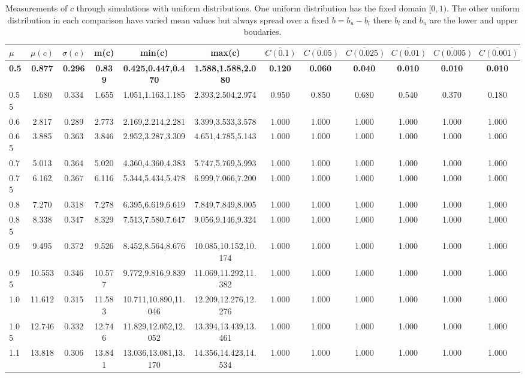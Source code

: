 \begin{table*}[h!]
\begin{center}
\begin{tabular}{| l | c | c | c | c | c | c | c | c | c | c | c |}\hline
$\mu$ & $\mu(c)$ & $\sigma(c)$ & m(c) & min(c) & max(c) & $\overline{C(0.1)}$ & $\overline{C(0.05)}$ & $\overline{C(0.025)}$ & $\overline{C(0.01)}$ & $\overline{C(0.005)}$ & $\overline{C(0.001)}$ \\\hline\hline
{\bf 0.5} & {\bf 0.877} & {\bf 0.296} & {\bf 0.839} & {\bf 0.425,0.447,0.470} & {\bf 1.588,1.588,2.080} & {\bf 0.120} & {\bf 0.060} & {\bf 0.040} & {\bf 0.010} & {\bf 0.010} & {\bf 0.010} \\\hline
0.55 & 1.680 & 0.334 & 1.655 & 1.051,1.163,1.185 & 2.393,2.504,2.974  & 0.950  & 0.850  & 0.680  & 0.540  & 0.370  & 0.180 \\\hline
0.6 & 2.817 & 0.289 & 2.773 & 2.169,2.214,2.281 & 3.399,3.533,3.578  & 1.000  & 1.000  & 1.000  & 1.000  & 1.000  & 1.000 \\\hline
0.65 & 3.885 & 0.363 & 3.846 & 2.952,3.287,3.309 & 4.651,4.785,5.143  & 1.000  & 1.000  & 1.000  & 1.000  & 1.000  & 1.000 \\\hline
0.7 & 5.013 & 0.364 & 5.020 & 4.360,4.360,4.383 & 5.747,5.769,5.993  & 1.000  & 1.000  & 1.000  & 1.000  & 1.000  & 1.000 \\\hline
0.75 & 6.162 & 0.367 & 6.116 & 5.344,5.434,5.478 & 6.999,7.066,7.200  & 1.000  & 1.000  & 1.000  & 1.000  & 1.000  & 1.000 \\\hline
0.8 & 7.270 & 0.318 & 7.278 & 6.395,6.619,6.619 & 7.849,7.849,8.005  & 1.000  & 1.000  & 1.000  & 1.000  & 1.000  & 1.000 \\\hline
0.85 & 8.338 & 0.347 & 8.329 & 7.513,7.580,7.647 & 9.056,9.146,9.324  & 1.000  & 1.000  & 1.000  & 1.000  & 1.000  & 1.000 \\\hline
0.9 & 9.495 & 0.372 & 9.526 & 8.452,8.564,8.676 & 10.085,10.152,10.174  & 1.000  & 1.000  & 1.000  & 1.000  & 1.000  & 1.000 \\\hline
0.95 & 10.553 & 0.346 & 10.577 & 9.772,9.816,9.839 & 11.069,11.292,11.382  & 1.000  & 1.000  & 1.000  & 1.000  & 1.000  & 1.000 \\\hline
1.0 & 11.612 & 0.315 & 11.583 & 10.711,10.890,11.046 & 12.209,12.276,12.276  & 1.000  & 1.000  & 1.000  & 1.000  & 1.000  & 1.000 \\\hline
1.05 & 12.746 & 0.332 & 12.746 & 11.829,12.052,12.052 & 13.394,13.439,13.461  & 1.000  & 1.000  & 1.000  & 1.000  & 1.000  & 1.000 \\\hline
1.1 & 13.818 & 0.306 & 13.841 & 13.036,13.081,13.170 & 14.356,14.423,14.534  & 1.000  & 1.000  & 1.000  & 1.000  & 1.000  & 1.000 \\\hline
\end{tabular}
\caption{Measurements of $c$ through simulations
with uniform distributions.
One uniform distribution has the fixed domain $[0,1)$.
The other uniform distribution in each comparison
have varied mean values but always
spread over a fixed $b=b_u-b_l$ there $b_l$ and $b_u$ are the lower and upper boudaries.}
\end{center}
\end{table*}